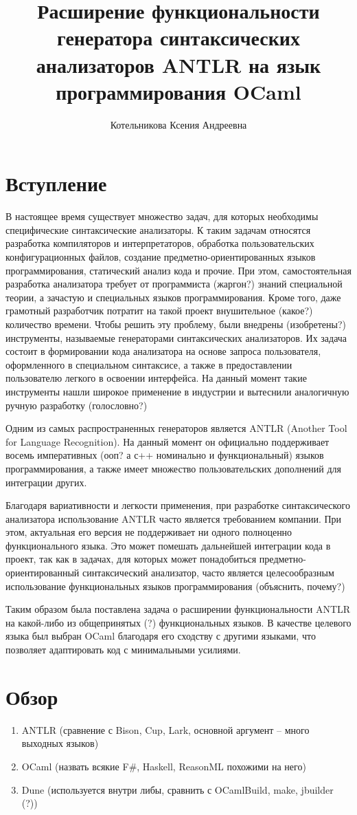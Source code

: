 \documentclass{article}
\title{Расширение функциональности генератора синтаксических анализаторов ANTLR на язык программирования OCaml}
\author{Котельникова Ксения Андреевна}
\begin{document}
\maketitle

\section{Вступление}

В настоящее время существует множество задач, для которых необходимы специфические синтаксические анализаторы. К таким задачам относятся разработка компиляторов и интерпретаторов, обработка пользовательских конфигурационных файлов, создание предметно-ориентированных языков программирования, статический анализ кода и прочие. При этом, самостоятельная разработка анализатора требует от программиста (жаргон?) знаний специальной теории, а зачастую и специальных языков программирования. Кроме того, даже грамотный разработчик потратит на такой проект внушительное (какое?) количество времени. Чтобы решить эту проблему, были внедрены (изобретены?) инструменты, называемые генераторами синтаксических анализаторов. Их задача состоит в формировании кода анализатора на основе запроса пользователя, оформленного в специальном синтаксисе, а также в предоставлении пользователю легкого в освоении интерфейса. На данный момент такие инструменты нашли широкое применение в индустрии и вытеснили аналогичную ручную разработку (голословно?)

Одним из самых распространенных генераторов является ANTLR (Another Tool for Language Recognition). На данный момент он официально поддерживает восемь императивных (ооп? а с++ номинально и функциональный) языков программирования, а также имеет множество пользовательских дополнений для интеграции других. 

Благодаря вариативности и легкости применения, при разработке синтаксического анализатора использование ANTLR часто является требованием компании. При этом, актуальная его версия не поддерживает ни одного полноценно функционального языка. Это может помешать дальнейшей интеграции кода в проект, так как в задачах, для которых может понадобиться предметно-ориентированный синтаксический анализатор, часто является целесообразным использование функциональных языков программирования (объяснить, почему?)

Таким образом была поставлена задача о расширении функциональности ANTLR на какой-либо из общепринятых (?) функциональных языков. В качестве целевого языка был выбран OCaml благодаря его сходству с другими языками, что позволяет адаптировать код с минимальными усилиями.

\section{Обзор}
\begin{enumerate}
    \item ANTLR (сравнение с Bison, Cup, Lark, основной аргумент -- много выходных языков)
    \item OCaml (назвать всякие F#, Haskell, ReasonML похожими на него)
    \item Dune (используется внутри либы, сравнить с OCamlBuild, make, jbuilder (?))
\end{enumerate}
\end{document}
